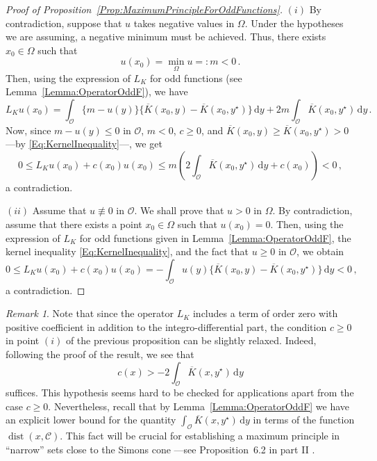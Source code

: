 \documentclass[12pt,reqno]{amsart}
\theoremstyle{definition}
\theoremstyle{remark}
\newtheorem{remark}[theorem]{Remark}
\newcommand{\ccal}{\mathscr{C}}
\newcommand{\ocal}{\mathcal{O}}
\renewcommand{\d}{\,\mathrm{d}} %
\DeclareMathOperator{\dist}{dist}
\numberwithin{equation}{section}
\begin{document}
	
	\begin{proof}[Proof of Proposition~\ref{Prop:MaximumPrincipleForOddFunctions}]
		$(i)$ By contradiction, suppose that $u$ takes negative values in $\Omega$. Under the hypotheses we are assuming, a negative minimum must be achieved. Thus, there exists $x_0\in \Omega$ such that
		$$
		u(x_0) = \min_{\Omega} u =: m < 0\,.
		$$
		Then, using the expression of $L_K$ for odd functions (see Lemma~\ref{Lemma:OperatorOddF}), we have
		$$
		L_K u (x_0) = \int_{\ocal} \{m - u(y) \} \{\overline{K}(x_0, y) - \overline{K}(x_0, y^\star)  \} \d y +  2 m \int_{\ocal} \overline{K}(x_0, y^\star) \d y\,.
		$$
		Now, since $m - u(y) \leq 0$ in $\ocal$, $m<0$, $c\geq 0$, and $\overline{K}(x_0, y) \geq \overline{K}(x_0, y^\star)>0$ ---by \eqref{Eq:KernelInequality}---, we get
		$$
		0 \leq L_K  u(x_0) + c(x_0) u(x_0) \leq m \left(2\int_{\ocal} \overline{K}(x_0, y^\star) \d y + c(x_0)\right)  < 0\,,
		$$
		a contradiction.
		
		$(ii)$ 
		Assume that $u \not \equiv 0$ in $\ocal$. We shall prove that $u > 0$ in $\Omega$. By contradiction, assume that there exists a point $x_0\in \Omega$ such that $u(x_0)= 0$. Then, using the expression of $L_K $ for odd functions given in Lemma~\ref{Lemma:OperatorOddF}, the kernel inequality \eqref{Eq:KernelInequality}, and the fact that $u\geq 0$ in $\ocal$, we obtain
		$$
		0 \leq L_K u(x_0) + c(x_0) u(x_0) = - \int_{\ocal} u(y)\big \{\overline{K}(x_0, y) - \overline{K}(x_0, y^\star) \big \}\d y < 0\,,
		$$
		a contradiction.
	\end{proof}
	
	\begin{remark}
		Note that since the operator $L_K$ includes a term of order zero with positive coefficient in addition to the integro-differential part, the condition $c\geq 0$ in point $(i)$ of the previous proposition can be slightly relaxed. Indeed, following the proof of the result, we see that
		$$ c(x) > -2\int_{\ocal} \overline{K}(x, y^\star) \d y $$
		suffices.
		This hypothesis seems hard to be checked for applications apart from the case $c\geq 0$. Nevertheless, recall that by Lemma~\ref{Lemma:OperatorOddF} we have an explicit lower bound for the quantity $ \int_{\ocal} \overline{K}(x, y^\star) \d y $ in terms of the function $\dist(x,\ccal)$. This fact will be crucial for establishing a maximum principle in ``narrow'' sets close to the Simons cone ---see Proposition~6.2 in part II \cite{FelipeSanz-Perela:IntegroDifferentialII}.
	\end{remark}
	
\end{document}
